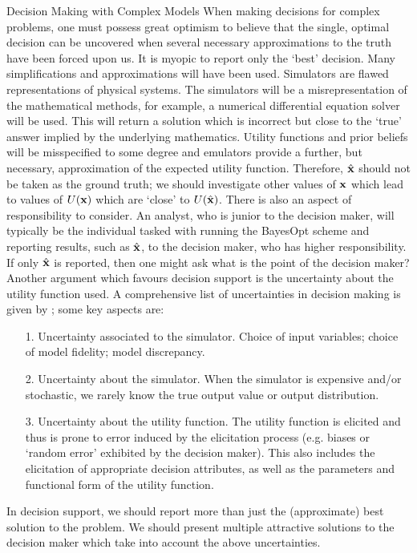 \begin{chapter}{Decision Making with Complex Models \label{Chap:optimisation}}
When making decisions for complex problems, one must possess great optimism to believe that the single, optimal decision can be uncovered when several necessary approximations to the truth have been forced upon us. It is myopic to report only the `best' decision. Many simplifications and approximations will have been used. Simulators are flawed representations of physical systems. The simulators will be a misrepresentation of the mathematical methods, for example, a numerical differential equation solver will be used. This will return a solution which is incorrect but close to the `true' answer implied by the underlying mathematics. Utility functions and prior beliefs will be misspecified to some degree and emulators provide a further, but necessary, approximation of the expected utility function. Therefore, $\hat{\mathbf{x}}$ should not be taken as the ground truth; we should investigate other values of $\mathbf{x}$ which lead to values of $U(\mathbf{x})$ which are `close' to $U(\hat{\mathbf{x}})$. There is also an aspect of responsibility to consider. An analyst, who is junior to the decision maker, will typically be the individual tasked with running the BayesOpt scheme and reporting results, such as $\hat{\mathbf{x}}$, to the decision maker, who has higher responsibility. If only $\hat{\mathbf{x}}$ is reported, then one might ask what is the point of the decision maker? Another argument which favours decision support is the uncertainty about the utility function used. A comprehensive list of uncertainties in decision making is given by \citet{Dent2020}; some key aspects are:
\begin{itemize}
	\item[1.] Uncertainty associated to the simulator. Choice of input variables; choice of model fidelity; model discrepancy.
	\item[2.] Uncertainty about the simulator. When the simulator is expensive and/or stochastic, we rarely know the true output value or output distribution.
	\item[3.] Uncertainty about the utility function. The utility function is elicited and thus is prone to error induced by the elicitation process (e.g. biases or `random error' exhibited by the decision maker). This also includes the elicitation of appropriate decision attributes, as well as the parameters and functional form of the utility function.
\end{itemize}

In decision support, we should report more than just the (approximate) best solution to the problem. We should present multiple attractive solutions to the decision maker which take into account the above uncertainties.

\end{chapter}
